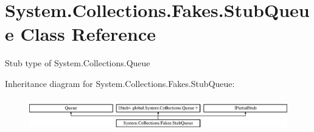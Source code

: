 \hypertarget{class_system_1_1_collections_1_1_fakes_1_1_stub_queue}{\section{System.\-Collections.\-Fakes.\-Stub\-Queue Class Reference}
\label{class_system_1_1_collections_1_1_fakes_1_1_stub_queue}
}


Stub type of System.\-Collections.\-Queue 


Inheritance diagram for System.\-Collections.\-Fakes.\-Stub\-Queue\-:\begin{figure}[H]
\begin{center}
\leavevmode
\includegraphics[height=1.447028cm]{class_system_1_1_collections_1_1_fakes_1_1_stub_queue}
\end{center}
\end{figure}
